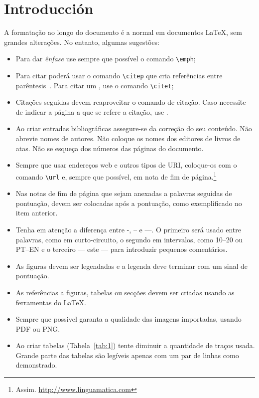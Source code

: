 \documentclass[a4paper, twocolumn, 11pt, twoside]{article}
\begin{document}



\section{Introducción}

A formatação ao longo do documento é a normal em documentos \LaTeX, sem grandes alterações. No entanto,
algumas sugestões:
\begin{itemize}
\item Para dar \emph{ênfase} use sempre que possível o comando \verb.\emph.;
\item Para citar poderá usar o comando \verb.\citep. que cria referências entre
  parêntesis~\citep{Goodfellow-et-al-2016}. Para citar um \citet{Rumshisky-Stubbs-2017}, 
  use o comando \verb.\citet.;
\item Citações seguidas devem reaproveitar o comando de citação. Caso necessite de indicar a página
  a que se refere a citação, use \citep[p.~4]{Batista-2023}.
\item Ao criar entradas bibliográficas assegure-se da correção do seu
  conteúdo. Não abrevie nomes de autores. Não coloque os nomes dos
  editores de livros de atas. Não se esqueça dos números das páginas
  do documento.
\item Sempre que usar endereços web e outros tipos de URI, coloque-os com o comando \verb.\url. e,
  sempre que possível, em nota de fim de página.\footnote{Assim. \url{http://www.linguamatica.com}}
\item Nas notas de fim de página que sejam anexadas a palavras seguidas de pontuação, devem ser colocadas
  após a pontuação, como exemplificado no item anterior.
\item Tenha em atenção a diferença entre -, -- e ---. O primeiro será usado entre palavras, como em
  curto-circuito, o segundo em intervalos, como 10--20 ou PT--EN e o terceiro --- este --- para
  introduzir pequenos comentários.
\item As figuras devem ser legendadas e a legenda deve terminar com um sinal de pontuação.
\item As referências a figuras, tabelas ou secções devem ser criadas usando as ferramentas do \LaTeX{}.
\item Sempre que possivel garanta a qualidade das imagens importadas, usando PDF ou PNG.
\item Ao criar tabelas (Tabela~\ref{tab:1}) tente diminuir a quantidade de traços usada. Grande parte das
  tabelas são legíveis apenas com um par de linhas como demonstrado.
\end{itemize}
\end{document}
